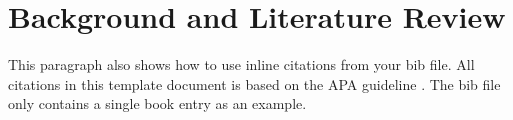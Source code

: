 \chapter{Background and Literature Review}

This paragraph also shows how to use inline citations from your bib file. All citations in this template document is based on the APA guideline \cite{american2012apa}. The bib file only contains a single book entry as an example.

\lipsum[2-2]
